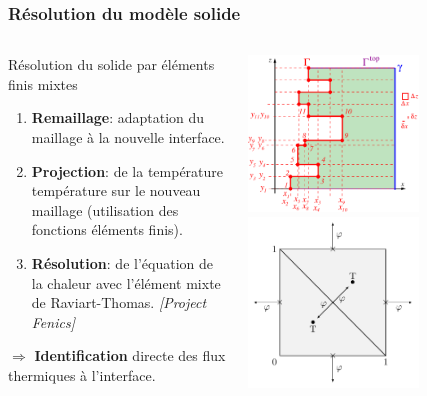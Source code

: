 \documentclass{beamer}
\newcommand{\bib}[1]{{\color{cea_texte!80}\tiny\textit{[#1]}}}
\begin{document}
\begin{frame}
    \frametitle{Résolution du modèle solide}
    \footnotesize


\begin{columns}[c]
	\begin{column}{0.6\textwidth}
	\begin{ceablock}{Résolution du solide par éléments finis mixtes}
\begin{enumerate}
			\item \textbf{Remaillage}: adaptation du maillage à la nouvelle interface.
			\item \textbf{Projection}: de la température température sur le nouveau maillage (utilisation des fonctions éléments finis).
			\item \textbf{Résolution}: de l'équation de la chaleur avec l'élément mixte de Raviart-Thomas. \bib{Project Fenics}
		\end{enumerate}
\center $\Rightarrow$ \textbf{Identification} directe des flux thermiques à l'interface.
		\end{ceablock}
	\end{column}
	\begin{column}{0.5\textwidth}
	\center
		\includegraphics[width=0.65\textwidth]{Figures/crust_mesh.pdf}\\
		\includegraphics[width=0.65\textwidth]{Figures/elementFiniMixte2.pdf}

		
			\end{column}

	\end{columns}

\end{frame}
\end{document}
